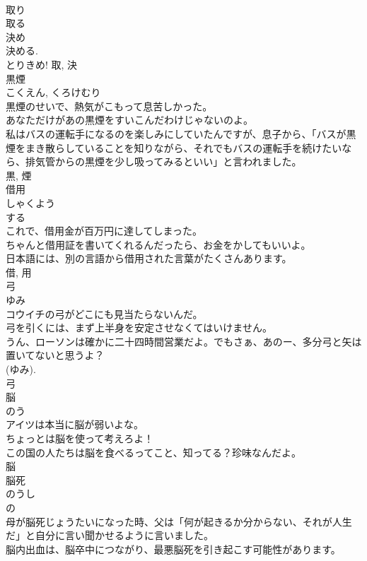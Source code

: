 \documentclass[8pt]{extreport}
\begin{document}
\begin{CJK}{UTF8}{min}
\\	取り 
\\	取る 
\\	決め 
\\	決める. 
\\	とりきめ!	取, 決	
\\	黒煙	
\\	こくえん, くろけむり	
\\	黒煙のせいで、熱気がこもって息苦しかった。	
\\	あなただけがあの黒煙をすいこんだわけじゃないのよ。	
\\	私はバスの運転手になるのを楽しみにしていたんですが、息子から、「バスが黒煙をまき散らしていることを知りながら、それでもバスの運転手を続けたいなら、排気管からの黒煙を少し吸ってみるといい」と言われました。	
\\	黒, 煙	
\\	借用	
\\	しゃくよう	
\\	する 
\\	これで、借用金が百万円に達してしまった。	
\\	ちゃんと借用証を書いてくれるんだったら、お金をかしてもいいよ。	
\\	日本語には、別の言語から借用された言葉がたくさんあります。	
\\	借, 用	
\\	弓	
\\	ゆみ	
\\	コウイチの弓がどこにも見当たらないんだ。	
\\	弓を引くには、まず上半身を安定させなくてはいけません。	
\\	うん、ローソンは確かに二十四時間営業だよ。でもさぁ、あのー、多分弓と矢は置いてないと思うよ？	
\\	(ゆみ). 
\\	弓	
\\	脳	
\\	のう	
\\	アイツは本当に脳が弱いよな。	
\\	ちょっとは脳を使って考えろよ！	
\\	この国の人たちは脳を食べるってこと、知ってる？珍味なんだよ。	
\\	脳	
\\	脳死	
\\	のうし	
\\	の 
\\	母が脳死じょうたいになった時、父は「何が起きるか分からない、それが人生だ」と自分に言い聞かせるように言いました。	
\\	脳内出血は、脳卒中につながり、最悪脳死を引き起こす可能性があります。	

\end{CJK}
\end{document}
